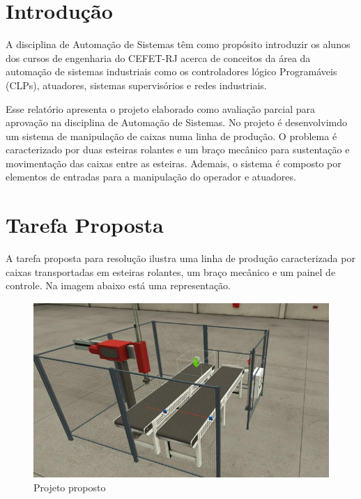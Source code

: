 \documentclass[
	12pt,				%
	openright,			%
	oneside,			%
	a4paper,			%
	english,			%
	brazil,				%
	]{abntex2}
\begin{document}

\frenchspacing 


\imprimircapa

\imprimirfolhaderosto*

\tableofcontents*
\cleardoublepage


\textual


\chapter{Introdução}
A disciplina de Automação de Sistemas têm como propósito introduzir os alunos dos cursos de engenharia do CEFET-RJ acerca de conceitos da área da automação de sistemas industriais como os controladores lógico Programáveis (CLPs), atuadores, sistemas supervisórios e redes industriais.  

Esse relatório apresenta o projeto elaborado como avaliação parcial para aprovação na disciplina de Automação de Sistemas. No projeto  é desenvolvimdo um sistema de manipulação de caixas numa linha de produção. O problema é caracterizado por duas esteiras rolantes e um braço mecânico para sustentação e movimentação das caixas entre as esteiras. Ademais, o sistema é composto por elementos de entradas para a manipulação do operador e atuadores.  

\chapter{Tarefa Proposta}

A tarefa proposta para resolução ilustra uma linha de produção caracterizada por caixas transportadas em esteiras rolantes, um braço mecânico e um painel de controle. Na imagem abaixo está uma representação.

\begin{figure}[htb!]
\centering
\includegraphics[width=0.5\linewidth]{Imagens/i1.PNG}
\caption{Projeto proposto}
\label{fig:problema}
\end{figure}
\end{document}
